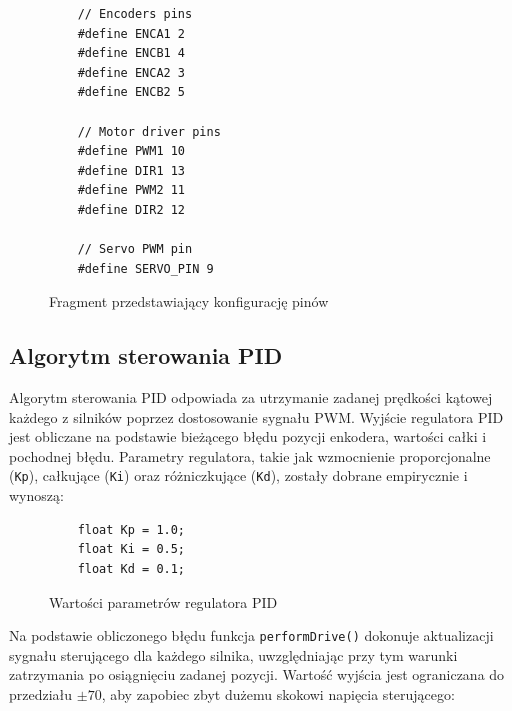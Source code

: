 \begin{figure}[H]
  \centering
  \begin{lstlisting}
    // Encoders pins
    #define ENCA1 2 
    #define ENCB1 4 
    #define ENCA2 3 
    #define ENCB2 5 
    
    // Motor driver pins
    #define PWM1 10
    #define DIR1 13
    #define PWM2 11
    #define DIR2 12
    
    // Servo PWM pin
    #define SERVO_PIN 9
  \end{lstlisting}
  \caption{Fragment przedstawiający konfigurację pinów}
  \label{fig:config}
\end{figure}

\subsection{Algorytm sterowania PID}

Algorytm sterowania PID odpowiada za utrzymanie zadanej prędkości kątowej każdego z silników poprzez dostosowanie sygnału PWM. Wyjście regulatora PID jest obliczane na podstawie bieżącego błędu pozycji enkodera, wartości całki i pochodnej błędu. Parametry regulatora, takie jak wzmocnienie proporcjonalne (\texttt{Kp}), całkujące (\texttt{Ki}) oraz różniczkujące (\texttt{Kd}), zostały dobrane empirycznie i wynoszą:

\begin{figure}[H]
  \centering
  \begin{lstlisting}
    float Kp = 1.0; 
    float Ki = 0.5; 
    float Kd = 0.1; 
  \end{lstlisting}
  \caption{Wartości parametrów regulatora PID}
  \label{fig:config-pid}
  \end{figure}

Na podstawie obliczonego błędu funkcja \texttt{performDrive()} dokonuje aktualizacji sygnału sterującego dla każdego silnika, uwzględniając przy tym warunki zatrzymania po osiągnięciu zadanej pozycji. Wartość wyjścia jest ograniczana do przedziału \( \pm 70 \), aby zapobiec zbyt dużemu skokowi napięcia sterującego:

